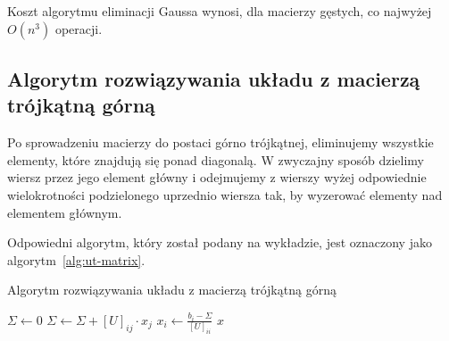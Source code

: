 \documentclass[../main.tex]{subfiles}
\begin{document}
    Koszt algorytmu eliminacji Gaussa wynosi, dla macierzy gęstych, co najwyżej \( O(n^3) \)
    operacji.

    \subsection{Algorytm rozwiązywania układu z macierzą trójkątną górną}
    
    Po sprowadzeniu macierzy do postaci górno trójkątnej, eliminujemy
    wszystkie elementy, które znajdują się ponad diagonalą. 
    W zwyczajny sposób dzielimy wiersz przez jego element główny
    i odejmujemy z wierszy wyżej odpowiednie wielokrotności
    podzielonego uprzednio wiersza tak, by wyzerować elementy
    nad elementem głównym.

    Odpowiedni algorytm, który został podany na wykładzie,
    jest oznaczony jako algorytm~\ref{alg:ut-matrix}.

    \begin{algorithm}
      \caption{Algorytm rozwiązywania układu z macierzą trójkątną górną}
      \label{alg:ut-matrix}
      \begin{algorithmic}[1]
            \State $\Sigma \gets 0$
              \State $\Sigma \gets \Sigma + [U]_{ij} \cdot x_j$
            \EndFor
            \State $x_i \gets \frac{b_i - \Sigma}{[U]_{ii}}$
          \EndFor
          \State \Return $x$
        \EndProcedure
      \end{algorithmic}
    \end{algorithm}
\end{document}
